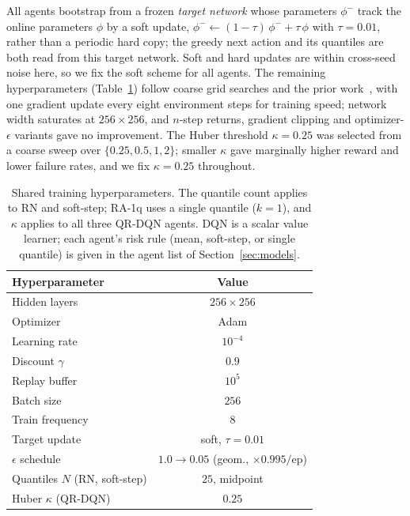 \documentclass[conference]{IEEEtran}
\begin{document}
All agents bootstrap from a frozen \emph{target network} whose parameters
$\phi^{-}$ track the online parameters $\phi$ by a soft update,
$\phi^{-}\!\leftarrow(1{-}\tau)\,\phi^{-}+\tau\,\phi$ with $\tau{=}0.01$, rather
than a periodic hard copy; the greedy next action and its quantiles are both read
from this target network.
Soft and hard updates are within cross-seed noise here, so we fix the soft scheme
for all agents. The remaining hyperparameters (Table~\ref{tab:hparams}) follow
coarse grid searches and the prior work~\cite{cmab_ho}, with one gradient update
every eight environment steps for training speed; network width saturates at
$256\times256$, and $n$-step returns, gradient clipping and optimizer-$\epsilon$
variants gave no improvement.
The Huber threshold $\kappa{=}0.25$ was selected
from a coarse sweep over $\{0.25,0.5,1,2\}$; smaller $\kappa$ gave marginally
higher reward and lower failure rates, and we fix $\kappa{=}0.25$ throughout.

\begin{table}[htbp]
\caption{Shared training hyperparameters. The quantile count applies to RN and
soft-step; RA-1q uses a single quantile ($k{=}1$), and $\kappa$ applies to all
three QR-DQN agents. DQN is a scalar value learner; each agent's risk rule (mean,
soft-step, or single quantile) is given in the agent list of
Section~\ref{sec:models}.}
\label{tab:hparams}
\centering
\begin{tabular}{|l|c|}
\hline
\textbf{Hyperparameter} & \textbf{Value} \\
\hline
Hidden layers       & $256\times256$ \\
Optimizer           & Adam \\
Learning rate       & $10^{-4}$ \\
Discount $\gamma$   & $0.9$ \\
Replay buffer       & $10^{5}$ \\
Batch size          & $256$ \\
Train frequency     & $8$ \\
Target update       & soft, $\tau{=}0.01$ \\
$\epsilon$ schedule & $1.0 \to 0.05$ (geom., $\times0.995/$ep) \\
\hline
Quantiles $N$ (RN, soft-step) & $25$, midpoint \\
Huber $\kappa$ (QR-DQN)       & $0.25$ \\
\hline
\end{tabular}
\end{table}
\end{document}
